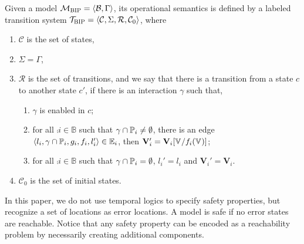 \begin{definition} 
\label{operational-semantics}
Given a \BIP model $\mathcal{M}_{\textsc{BIP}}=\langle{\ensuremath{\mathcal{B}},\Gamma}\rangle$,
 its operational semantics is defined by a labeled transition system
 $\mathcal{T}_{\textsc{BIP}} = \langle{\mathcal{C}, \Sigma, \mathcal{R}, \mathcal{C}_{0}}\rangle$, where
%
\begin{enumerate}
\item $\mathcal{C}$ is the set of states,
\item $\Sigma = \Gamma $,
\item $\mathcal{R}$ is the set of transitions,
  and we say that there is a transition from a state $c$
  to another state $c'$,
  if there is an interaction $\gamma $ such that,
%
\begin{enumerate}
  \item $\gamma$ is enabled in $c$;
  \item for all $\comp{i} \in \mathbb{B}$ such that
    $\gamma \cap \mathbb{P}_{i} \neq \emptyset$, there is an edge
    $\langle{l_i, \gamma \cap \ensuremath{\mathbb{P}_{i}}, g_i, f_i, l_i'}\rangle \in \mathbb{E}_{i} $,
    then $\mathbf{V}'_{i} = \mathbf{V}_{i}[\mathbb{V}_{} / f_i(\mathbb{V}_{})]$;
  \item for all $\comp{i} \in \mathbb{B} $ such that
    $\gamma \cap \mathbb{P}_{i} = \emptyset $,
    $l_i' = l_i$ and $\mathbf{V}_i' = \mathbf{V}_i$.
\end{enumerate}
\item $\mathcal{C}_{0}$ is the set of initial states.
\end{enumerate}
\end{definition}

%
%
%
In this paper, we do not use temporal logics to specify safety properties,
 but recognize a set of locations as error locations.
 A \BIP model is safe if no error states are reachable.
 Notice that any safety property can be encoded as a reachability
 problem by necessarily creating additional components.

